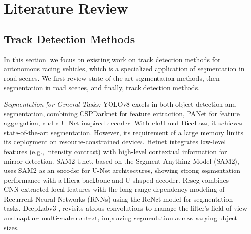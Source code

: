 \section{Literature Review}
\subsection{Track Detection Methods }
In this section, we focus on existing work on track detection methods for autonomous racing vehicles, which is a specialized application of segmentation in road scenes. We first review state-of-the-art segmentation methods, then segmentation in road scenes, and finally, track detection methods. 




\textit{Segmentation for General Tasks:} YOLOv8\cite{yolov8} excels in both object detection and segmentation, combining CSPDarknet for feature extraction, PANet for feature aggregation, and a U-Net inspired decoder. With cIoU and DiceLoss, it achieves state-of-the-art segmentation. However, its  requirement of a large memory limits its deployment on resource-constrained devices. Hetnet\cite{hetnet} integrates low-level features (e.g., intensity contrast) with high-level contextual information for mirror detection. SAM2-Unet\cite{sam2-unet}, based on the Segment Anything Model (SAM2)\cite{sam2}, uses SAM2 as an encoder for U-Net architectures, showing strong segmentation performance with a Hiera backbone and U-shaped decoder. Reseg\cite{reseg} combines CNN-extracted local features with the long-range dependency modeling of Recurrent Neural Networks (RNNs) using the ReNet\cite{renet} model for segmentation tasks. DeepLabv3\cite{deeplabv3}%
, revisits atrous convolutions to manage the filter’s field-of-view and capture multi-scale context, improving segmentation across varying object sizes.

